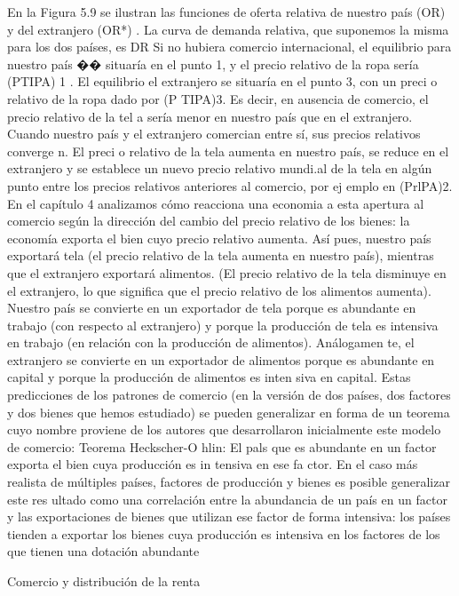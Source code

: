 \documentclass[10pt,a4paper]{article}
\begin{document}
En la Figura 5.9 se ilustran las funciones de oferta relativa de nuestro país (OR) y del extranjero (OR*) . La curva de demanda relativa, que suponemos la misma para los dos países, es DR Si no hubiera comercio internacional, el equilibrio para nuestro país �� situaría en el punto 1, y el precio relativo de la ropa sería (PTIPA) 1 . El equilibrio el extranjero se situaría en el punto 3, con un preci o relativo de la ropa dado por (P TIPA)3. Es decir, en ausencia de comercio, el precio relativo de la tel a sería menor en nuestro país que en el extranjero. Cuando nuestro país y el extranjero comercian entre sí, sus precios relativos converge n. El preci o relativo de la tela aumenta en nuestro país, se reduce en el extranjero y se establece un nuevo precio relativo mundi.al de la tela en algún punto entre los precios relativos anteriores al comercio, por ej emplo en (PrlPA)2. En el capítulo 4 analizamos cómo reacciona una economia a esta apertura al comercio según la dirección del cambio del precio relativo de los bienes: la economía exporta el bien cuyo precio relativo aumenta. Así pues, nuestro país exportará tela (el precio relativo de la tela aumenta en nuestro país), mientras que el extranjero exportará alimentos. (El precio relativo de la tela disminuye en el extranjero, lo que significa que el precio relativo de los alimentos aumenta). Nuestro país se convierte en un exportador de tela porque es abundante en trabajo (con respecto al extranjero) y porque la producción de tela es intensiva en trabajo (en relación con la producción de alimentos). Análogamen te, el extranjero se convierte en un exportador de alimentos porque es abundante en capital y porque la producción de alimentos es inten siva en capital. Estas predicciones de los patrones de comercio (en la versión de dos países, dos factores y dos bienes que hemos estudiado) se pueden generalizar en forma de un teorema cuyo nombre proviene de los autores que desarrollaron inicialmente este modelo de comercio: Teorema Heckscher-O hlin: El pals que es abundante en un factor exporta el bien cuya producción es in tensiva en ese fa ctor. En el caso más realista de múltiples países, factores de producción y bienes es posible generalizar este res ultado como una correlación entre la abundancia de un país en un factor y las exportaciones de bienes que utilizan ese factor de forma intensiva: los países tienden a exportar
los bienes cuya producción es intensiva en los factores de los que tienen una dotación abundante 



Comercio y distribución de la renta 
\end{document}
